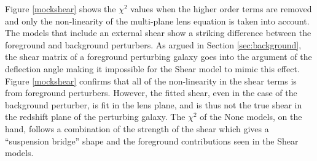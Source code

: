 Figure \ref{mockshear} shows the $\chi^2$ values when the higher order terms are removed and only the non-linearity of the multi-plane lens equation is taken into account. The models that include an external shear show a striking difference between the foreground and background perturbers. As argued in Section \ref{sec:background}, the shear matrix of a foreground perturbing galaxy goes into the argument of the deflection angle making it impossible for the Shear model to mimic this effect. Figure \ref{mockshear} confirms that all of the non-linearity in the shear terms is from foreground perturbers. However, the fitted shear, even in the case of the background perturber, is fit in the lens plane, and is thus not the true shear in the redshift plane of the perturbing galaxy. The $\chi^2$ of the None models, on the hand, follows a combination of the strength of the shear which gives a ``suspension bridge'' shape \citep{Momcheva06} and the foreground contributions seen in the Shear models.